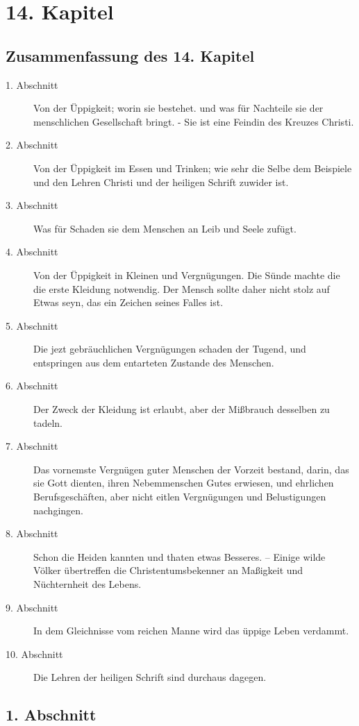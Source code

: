 
\chapter{14. Kapitel}

\section{Zusammenfassung des 14. Kapitel}
\small
\begin{description}
\item[1. Abschnitt] Von der Üppigkeit; worin sie bestehet. und was für Nachteile sie der menschlichen Gesellschaft bringt. - Sie ist eine Feindin des Kreuzes Christi.
\item[2. Abschnitt] Von der Üppigkeit im Essen und Trinken; wie sehr die Selbe dem Beispiele und den Lehren Christi und der heiligen Schrift zuwider ist.
\item[3. Abschnitt] Was für Schaden sie dem Menschen an Leib und Seele zufügt.
\item[4. Abschnitt] Von der Üppigkeit in Kleinen und Vergnügungen. Die Sünde machte die die erste Kleidung notwendig. Der Mensch sollte daher nicht stolz auf Etwas seyn, das ein Zeichen seines Falles ist.
\item[5. Abschnitt] Die jezt gebräuchlichen Vergnügungen schaden der Tugend, und entspringen aus dem entarteten Zustande des Menschen.
\item[6. Abschnitt] Der Zweck der Kleidung ist erlaubt, aber der Mißbrauch desselben zu tadeln.
\item[7. Abschnitt] Das vornemste Vergnügen guter Menschen der Vorzeit bestand, darin, das sie Gott dienten, ihren Nebemmenschen Gutes erwiesen, und ehrlichen Berufsgeschäften, aber nicht eitlen Vergnügungen und Belustigungen nachgingen.
\item[8. Abschnitt] Schon die Heiden kannten und thaten etwas Besseres. -- Einige wilde Völker übertreffen die Christentumsbekenner an Maßigkeit und Nüchternheit des Lebens.
\item[9. Abschnitt] In dem Gleichnisse vom reichen Manne wird das üppige Leben verdammt.
\item[10. Abschnitt] Die Lehren der heiligen Schrift sind durchaus dagegen.
\end{description}
\normalsize

\section{1. Abschnitt}

